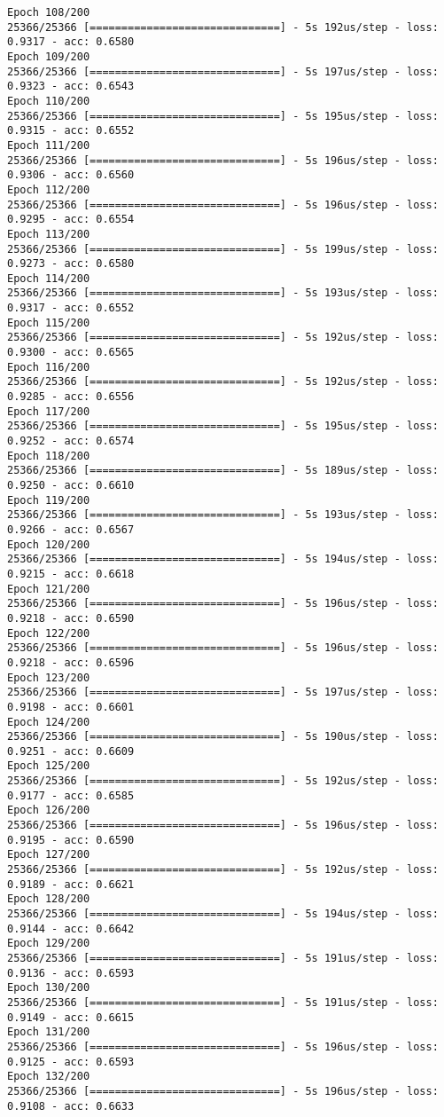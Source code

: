 \documentclass[11pt]{article}
\begin{document}
\begin{Verbatim}[commandchars=\\\{\}]
Epoch 108/200
25366/25366 [==============================] - 5s 192us/step - loss: 0.9317 - acc: 0.6580
Epoch 109/200
25366/25366 [==============================] - 5s 197us/step - loss: 0.9323 - acc: 0.6543
Epoch 110/200
25366/25366 [==============================] - 5s 195us/step - loss: 0.9315 - acc: 0.6552
Epoch 111/200
25366/25366 [==============================] - 5s 196us/step - loss: 0.9306 - acc: 0.6560
Epoch 112/200
25366/25366 [==============================] - 5s 196us/step - loss: 0.9295 - acc: 0.6554
Epoch 113/200
25366/25366 [==============================] - 5s 199us/step - loss: 0.9273 - acc: 0.6580
Epoch 114/200
25366/25366 [==============================] - 5s 193us/step - loss: 0.9317 - acc: 0.6552
Epoch 115/200
25366/25366 [==============================] - 5s 192us/step - loss: 0.9300 - acc: 0.6565
Epoch 116/200
25366/25366 [==============================] - 5s 192us/step - loss: 0.9285 - acc: 0.6556
Epoch 117/200
25366/25366 [==============================] - 5s 195us/step - loss: 0.9252 - acc: 0.6574
Epoch 118/200
25366/25366 [==============================] - 5s 189us/step - loss: 0.9250 - acc: 0.6610
Epoch 119/200
25366/25366 [==============================] - 5s 193us/step - loss: 0.9266 - acc: 0.6567
Epoch 120/200
25366/25366 [==============================] - 5s 194us/step - loss: 0.9215 - acc: 0.6618
Epoch 121/200
25366/25366 [==============================] - 5s 196us/step - loss: 0.9218 - acc: 0.6590
Epoch 122/200
25366/25366 [==============================] - 5s 196us/step - loss: 0.9218 - acc: 0.6596
Epoch 123/200
25366/25366 [==============================] - 5s 197us/step - loss: 0.9198 - acc: 0.6601
Epoch 124/200
25366/25366 [==============================] - 5s 190us/step - loss: 0.9251 - acc: 0.6609
Epoch 125/200
25366/25366 [==============================] - 5s 192us/step - loss: 0.9177 - acc: 0.6585
Epoch 126/200
25366/25366 [==============================] - 5s 196us/step - loss: 0.9195 - acc: 0.6590
Epoch 127/200
25366/25366 [==============================] - 5s 192us/step - loss: 0.9189 - acc: 0.6621
Epoch 128/200
25366/25366 [==============================] - 5s 194us/step - loss: 0.9144 - acc: 0.6642
Epoch 129/200
25366/25366 [==============================] - 5s 191us/step - loss: 0.9136 - acc: 0.6593
Epoch 130/200
25366/25366 [==============================] - 5s 191us/step - loss: 0.9149 - acc: 0.6615
Epoch 131/200
25366/25366 [==============================] - 5s 196us/step - loss: 0.9125 - acc: 0.6593
Epoch 132/200
25366/25366 [==============================] - 5s 196us/step - loss: 0.9108 - acc: 0.6633

\end{Verbatim}
\end{document}
